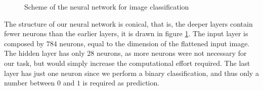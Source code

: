 \documentclass[a4paper,11pt,oneside]{book}
\def\nstyle{int(\lay<\Nnodlen?min(2,\lay):3)} %
\begin{document}
\begin{figure}
\centering
{}
\caption{Scheme of the neural network for image classification}
\label{NN_scheme}
\end{figure}


The structure of our neural network is conical, that is, the deeper layers contain fewer neurons than the earlier layers, it is drawn in figure \ref{NN_scheme}. 
The input layer is composed by $784$ neurons, equal to the dimension of the flattened input image. The hidden layer has only 28 neurons, as more neurons were not necessary for our task, but would simply increase the computational effort required. The last layer has just one neuron since we perform a binary classification, and thus only a number between $0$ and $1$ is required as prediction.
\end{document}
